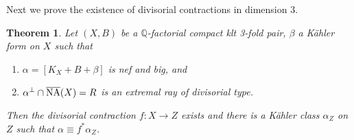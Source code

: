 \documentclass[12pt]{amsart}
\theoremstyle{plain}
\newtheorem{theorem}{Theorem}[section]
\theoremstyle{remark}
\theoremstyle{definition}
\newcommand{\<}{\leq}
\newcommand{\Q}{{\mathbb{Q}}}
\theoremstyle{definition}
\theoremstyle{definition}
\numberwithin{equation}{section}
\theoremstyle{remark}
\begin{document}
Next we prove the existence of divisorial contractions in dimension $3$.
\begin{theorem}\label{t-divcont} Let $(X,B)$ be a $\Q$-factorial compact klt 3-fold pair, $\beta$ a K\"ahler form on $X$ such that 
\begin{enumerate}
    \item $\alpha =[K_X+B+\beta]$ is nef and big, and
\item $\alpha ^\perp \cap \overline{\rm NA}(X)=R$ is an extremal ray of divisorial type.
\end{enumerate} Then the divisorial contraction $f:X\to Z$ exists and there is a K\"ahler class $\alpha _Z$ on $Z$ such that $\alpha \equiv f^*\alpha _Z$.
\end{theorem}
\end{document}
